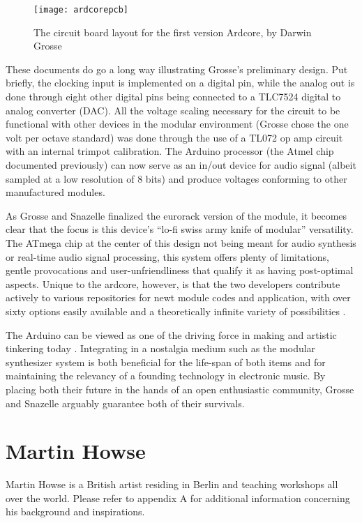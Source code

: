 		\begin{figure}[H]
		  \caption{The circuit board layout for the first version Ardcore, by Darwin Grosse}
		  \centering
		    \texttt{[image: ardcorepcb]}
		\end{figure}

These documents do go a long way illustrating Grosse's preliminary design. Put briefly, the clocking input is implemented on a digital pin, while the analog out is done through eight other digital pins being connected to a TLC7524 digital to analog converter (DAC). All the voltage scaling necessary for the circuit to be functional with other devices in the modular environment (Grosse chose the one volt per octave standard) was done through the use of a TL072 op amp circuit with an internal trimpot calibration. The Arduino processor (the Atmel chip documented previously) can now serve as an in/out device for audio signal (albeit sampled at a low resolution of 8 bits) and produce voltages conforming to other manufactured modules. 

As Grosse and Snazelle finalized the eurorack version of the module, it becomes clear that the focus is this device's ``lo-fi swiss army knife of modular'' versatility. The ATmega chip at the center of this design not being meant for audio synthesis or real-time audio signal processing, this system offers plenty of limitations, gentle provocations and user-unfriendliness that qualify it as having post-optimal aspects. Unique to the ardcore, however, is that the two developers contribute actively to various repositories for newt module codes and application, with over sixty options easily available and a theoretically infinite variety of possibilities \citep{ardcode, ardcodeb}. 

The Arduino can be viewed as one of the driving force in making and artistic tinkering today \citep{gibb2010}. Integrating in a nostalgia medium such as the modular synthesizer system is both beneficial for the life-span of both items and for maintaining the relevancy of a founding technology in electronic music. By placing both their future in the hands of an open enthusiastic community, Grosse and Snazelle arguably guarantee both of their survivals.  

\section{Martin Howse}

Martin Howse is a British artist residing in Berlin and teaching workshops all over the world. Please refer to appendix A for additional information concerning his background and inspirations. 

